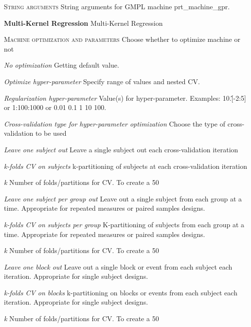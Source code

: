 \textsc{String arguments}
String arguments for GMPL machine prt\_machine\_gpr.


\textbf{Multi-Kernel Regression}
Multi-Kernel Regression


\textsc{Machine optimization and parameters}
Choose whether to optimize machine or not


\textsl{No optimization}
Getting default value.


\textsl{Optimize hyper-parameter}
Specify range of values and nested CV.


\textit{Regularization hyper-parameter}
Value(s) for hyper-parameter. Examples: 10.\^[-2:5] or 1:100:1000 or 0.01 0.1 1 10 100.


\textit{Cross-validation type for hyper-parameter optimization}
Choose the type of cross-validation to be used


\textit{Leave one subject out}
Leave a single subject out each cross-validation iteration


\textit{k-folds CV on subjects}
k-partitioning of subjects at each cross-validation iteration


\textit{k}
Number of folds/partitions for CV. To create a 50%


\textit{Leave one subject per group out}
Leave out a single subject from each group at a time. Appropriate for repeated measures or paired samples designs.


\textit{k-folds CV on subjects per group}
K-partitioning of subjects from each group at a time. Appropriate for repeated measures or paired samples designs.


\textit{k}
Number of folds/partitions for CV. To create a 50%


\textit{Leave one block out}
Leave out a single block or event from each subject each iteration. Appropriate for single subject designs.


\textit{k-folds CV on blocks}
k-partitioning on blocks or events from each subject each iteration. Appropriate for single subject designs.


\textit{k}
Number of folds/partitions for CV. To create a 50%



